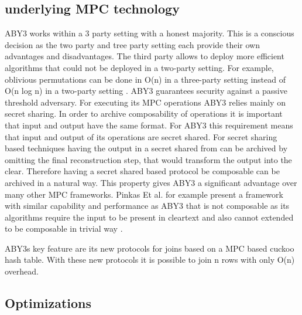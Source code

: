\subsection{underlying MPC technology}
ABY3 works within a 3 party setting with a honest majority. This is a conscious decision as the two party and tree party setting each provide their own advantages and disadvantages.
The third party allows to deploy more efficient algorithms that could not be deployed in a two-party setting. For example, oblivious permutations can be done in O(n) in a three-party setting instead of O(n log n) in a two-party setting \cite{aby3}.
 ABY3 guarantees security against a passive threshold adversary. For executing its MPC operations ABY3 relies mainly on secret sharing. In order to archive composability of operations it is important that input and output have the same format. For ABY3 this requirement means that input and output of its operations are secret shared. For secret sharing based techniques having the output in a secret shared from can be archived by omitting the final  reconstruction step, that would transform the output into the clear. Therefore having a secret shared based protocol be composable can be archived in a natural way. This property gives ABY3 a significant advantage over many other MPC frameworks. Pinkas Et al. \cite{pinkas2014faster} for example present a framework with similar capability and performance as ABY3 that is not composable as its algorithms require the input to be present in cleartext and also cannot extended to be composable in trivial way \cite{aby3}.      
  
 
ABY3s key feature are its new protocols for joins based on a MPC based cuckoo hash table. With these new protocols it is possible to join n rows with only O(n) overhead.


\subsection{Optimizations}
